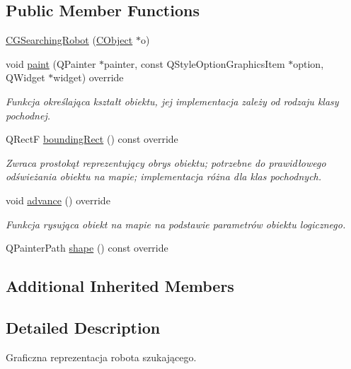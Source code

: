 \subsection*{Public Member Functions}
\begin{DoxyCompactItemize}
\item 
\mbox{\hyperlink{class_c_g_searching_robot_a6d8b0f84b870aa6af83323d72d0bf010}{C\+G\+Searching\+Robot}} (\mbox{\hyperlink{class_c_object}{C\+Object}} $\ast$o)
\item 
void \mbox{\hyperlink{class_c_g_searching_robot_ad6e9d94604256cb9f0fe6e708c4391ad}{paint}} (Q\+Painter $\ast$painter, const Q\+Style\+Option\+Graphics\+Item $\ast$option, Q\+Widget $\ast$widget) override
\begin{DoxyCompactList}\small\item\em Funkcja określająca kształt obiektu, jej implementacja zależy od rodzaju klasy pochodnej. \end{DoxyCompactList}\item 
Q\+RectF \mbox{\hyperlink{class_c_g_searching_robot_aa0cf51f6acdfa865c130f0cd16860625}{bounding\+Rect}} () const override
\begin{DoxyCompactList}\small\item\em Zwraca prostokąt reprezentujący obrys obiektu; potrzebne do prawidłowego odświeżania obiektu na mapie; implementacja różna dla klas pochodnych. \end{DoxyCompactList}\item 
void \mbox{\hyperlink{class_c_g_searching_robot_adcc4b3096e11c25287806428119acb22}{advance}} () override
\begin{DoxyCompactList}\small\item\em Funkcja rysująca obiekt na mapie na podstawie parametrów obiektu logicznego. \end{DoxyCompactList}\item 
Q\+Painter\+Path \mbox{\hyperlink{class_c_g_searching_robot_acd63b054e31c88aaf2070a829e1f897a}{shape}} () const override
\end{DoxyCompactItemize}
\subsection*{Additional Inherited Members}


\subsection{Detailed Description}
Graficzna reprezentacja robota szukającego. 

